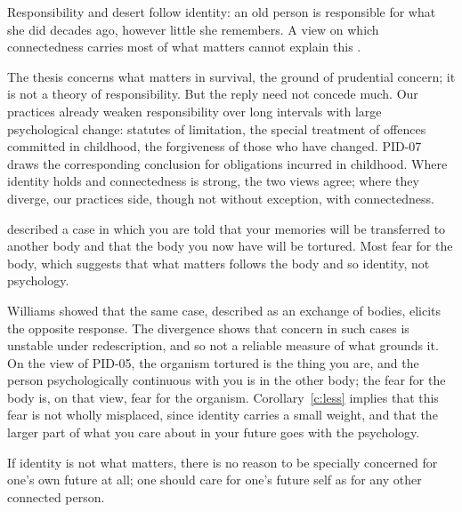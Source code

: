 \documentclass{situationist-preprint}
\begin{document}
\begin{objection}[Responsibility]
Responsibility and desert follow identity: an old person is responsible for what she did decades ago, however little she remembers. A view on which connectedness carries most of what matters cannot explain this \citep{Schechtman1996}.
\end{objection}

\begin{reply}
The thesis concerns what matters in survival, the ground of prudential concern; it is not a theory of responsibility. But the reply need not concede much. Our practices already weaken responsibility over long intervals with large psychological change: statutes of limitation, the special treatment of offences committed in childhood, the forgiveness of those who have changed. PID-07 draws the corresponding conclusion for obligations incurred in childhood. Where identity holds and connectedness is strong, the two views agree; where they diverge, our practices side, though not without exception, with connectedness.
\end{reply}

\begin{objection}
\citet{Williams1970} described a case in which you are told that your memories will be transferred to another body and that the body you now have will be tortured. Most fear for the body, which suggests that what matters follows the body and so identity, not psychology.
\end{objection}

\begin{reply}
Williams showed that the same case, described as an exchange of bodies, elicits the opposite response. The divergence shows that concern in such cases is unstable under redescription, and so not a reliable measure of what grounds it. On the view of PID-05, the organism tortured is the thing you are, and the person psychologically continuous with you is in the other body; the fear for the body is, on that view, fear for the organism. Corollary~\ref{c:less} implies that this fear is not wholly misplaced, since identity carries a small weight, and that the larger part of what you care about in your future goes with the psychology.
\end{reply}

\begin{objection}
If identity is not what matters, there is no reason to be specially concerned for one's own future at all; one should care for one's future self as for any other connected person.
\end{objection}
\end{document}

